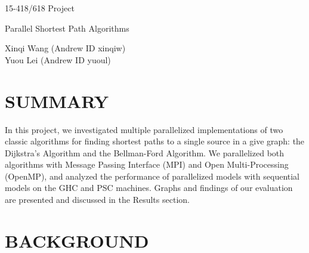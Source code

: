\documentclass[12pt]{article}
\begin{document}
\begin{titlepage}
   \begin{center}
        \vspace*{5cm}

        \Huge{15-418/618 Project}

        \Huge{Parallel Shortest Path Algorithms}
            
        \vspace{0.5 cm}
        \Large{}{}{Xinqi Wang (Andrew ID xinqiw)}\\
        \Large{}{}{Yuou Lei (Andrew ID yuoul)}
       
        \vspace{1cm}
    \end{center}
    
\end{titlepage}

\setcounter{page}{2}
\pagestyle{plain}
\fancyhf{}
\rhead{\thepage}

\doublespacing
\section{SUMMARY}
In this project, we investigated multiple parallelized implementations of two classic algorithms for finding shortest paths to a single source in a give graph: the Dijkstra's Algorithm and the Bellman-Ford Algorithm. We parallelized both algorithms with Message Passing Interface (MPI) and Open Multi-Processing (OpenMP), and analyzed the performance of parallelized models with sequential models on the GHC and PSC machines. Graphs and findings of our evaluation are presented and discussed in the Results section.
\section{BACKGROUND}
\end{document}
